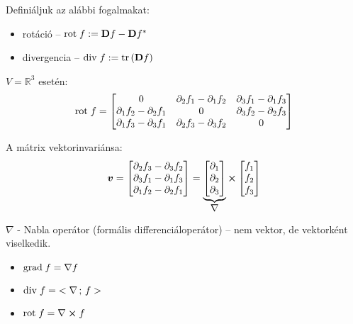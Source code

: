 \documentclass[main.tex]{subfiles}
\begin{document}
Definiáljuk az alábbi fogalmakat:
\begin{itemize}
  \item rotáció
        \tabto{2.4cm} – \tabto{3cm}
        $\mathrm{rot} \; f := \mathbf{D} f - \mathbf{D} f ^{*}$

  \item divergencia
        \tabto{2.4cm} – \tabto{3cm}
        $\mathrm{div} \; f := \tr \left( \mathbf{D} f \right)$
\end{itemize}

$V = \mathbb{R}^3$ esetén:
\begin{equation*}
  \mathrm{rot} \; f
  =
  \begin{bmatrix}
    0                               &
    \partial_2 f_1 - \partial_1 f_2 &
    \partial_3 f_1 - \partial_1 f_3
    \\
    \partial_1 f_2 - \partial_2 f_1 &
    0                               &
    \partial_3 f_2 - \partial_2 f_3
    \\
    \partial_1 f_3 - \partial_3 f_1 &
    \partial_2 f_3 - \partial_3 f_2 &
    0
  \end{bmatrix}
\end{equation*}

A mátrix vektorinvariánsa:
\begin{equation*}
  \bm{v}
  =
  \begin{bmatrix}
    \partial_2 f_3 - \partial_3 f_2 \\
    \partial_3 f_1 - \partial_1 f_3 \\
    \partial_1 f_2 - \partial_2 f_1
  \end{bmatrix}
  =
  \underbrace{
    \begin{bmatrix}
      \partial_1 \\
      \partial_2 \\
      \partial_3
    \end{bmatrix}
  }_{\displaystyle\nabla}
  \cross
  \begin{bmatrix}
    f_1 \\
    f_2 \\
    f_3
  \end{bmatrix}
\end{equation*}

$\nabla$ - Nabla operátor (formális differenciáloperátor)
– nem vektor, de vektorként viselkedik.

\pagebreak


\begin{itemize}
  \item $\mathrm{grad} \; f = \nabla f$
  \item $\mathrm{div} \; f = \; < \nabla \, ; \, f >$
  \item $\mathrm{rot} \; f = \nabla \cross f$
\end{itemize}
\end{document}
